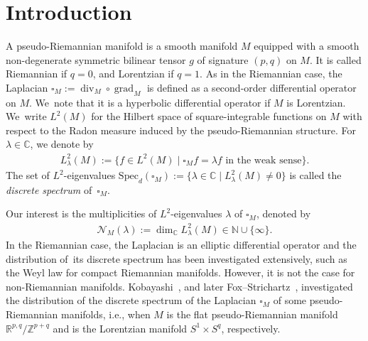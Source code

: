 \documentclass[pdftex]{sigma}
\numberwithin{equation}{section}
\begin{document}
\section{Introduction}
A pseudo-Riemannian manifold is a smooth manifold $M$ equipped with
a smooth non-degenerate symmetric bilinear tensor $g$
 of signature $(p,q)$ on $M$.
It is called Riemannian if $q=0$, and Lorentzian if $q=1$.
As in the Riemannian case,
the Laplacian $\square_{M}:=\operatorname{div}_{M} \circ \operatorname{grad}_{M}$
is defined as a second-order differential operator on $M$. We~note that it is a
hyperbolic differential operator if $M$ is Lorentzian. We~write $L^2(M)$ for the Hilbert space of square-integrable functions on $M$
with respect to the Radon measure induced by the pseudo-Riemannian structure.
For $\lambda \in \mathbb{C}$, we denote by
\begin{gather*}
L^2_{\lambda}(M) :=
\big\{f \in L^2(M) \mid \square_{M}f = \lambda f \text{ in the weak sense}\big\}.
\end{gather*}
The set of $L^2$-eigenvalues
$\mathrm{Spec}_{d}(\square_{M}) := \big\{ \lambda \in \mathbb{C}
\mid L^2_{\lambda}(M)\neq0\big\}$
is called the \textit{discrete spectrum} of~$\square_{M}$.

Our interest is the multiplicities of $L^2$-eigenvalues $\lambda$ of $\square_{M}$,
denoted by
\begin{gather*}
\mathcal{N}_{M}(\lambda):= \operatorname{dim}_{\mathbb{C}}L^2_{\lambda}(M)
\in \mathbb{N}\cup\{\infty\}.
\end{gather*}
In the Riemannian case, the Laplacian is an elliptic differential operator
and the distribution of~its discrete spectrum has been investigated extensively,
such as the Weyl law for compact Riemannian manifolds.
However, it is not the case for non-Riemannian manifolds.
Kobayashi~\cite{Kob16}, and later Fox--Strichartz~\cite{FoSt18},
investigated the distribution of the discrete spectrum of
the Laplacian $\square_{M}$ of some pseudo-Riemannian manifolds, i.e., when
$M$ is the flat pseudo-Riemannian manifold $\mathbb{R}^{p,q}/\mathbb{Z}^{p+q}$
and is the Lorentzian manifold $S^1\times S^{q}$, respectively.
\end{document}
